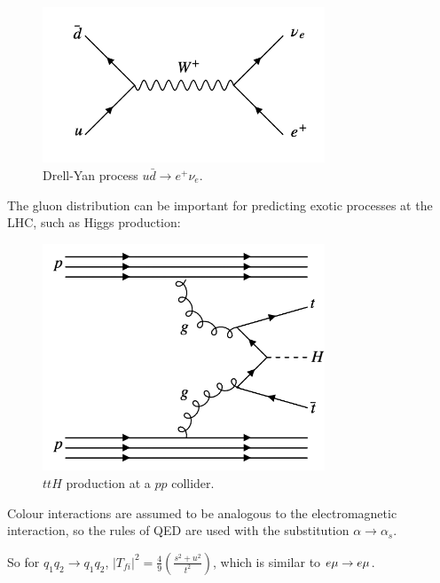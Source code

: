 \begin{figure}[!htb]
  \begin{center}
    \includegraphics[width=0.75\textwidth]{images/web_feynman/image_65.png}
    \caption[Drell-Yan process $u\bar{d}\to e^+\nu_e$]{Drell-Yan process $u\bar{d}\to e^+\nu_e$.}
    \label{fig:ch14_DrellYanUDToENu}
  \end{center}
\end{figure}

The gluon distribution can be important for predicting exotic processes at the LHC, such as Higgs production:

\begin{figure}[!htb]
  \begin{center}
    \includegraphics[width=0.75\textwidth]{images/web_feynman/image_66.png}
    \caption[$ttH$ production]{$ttH$ production at a $pp$ collider.}
    \label{fig:ch14_DrellYanUDToENu}
  \end{center}
\end{figure}

Colour interactions are assumed to be analogous to the electromagnetic interaction, so the rules of QED are used with the substitution $\alpha \to \alpha_s$.

So for $q_1 q_2 \to q_1 q_2$, $|T_{fi}|^2 = \frac{4}{9}\left(\frac{s^2 + u^2}{t^2}\right)$, which is similar to $e\mu \to e\mu$.


